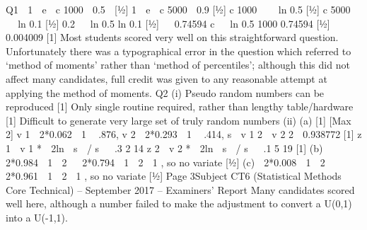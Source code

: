 \documentclass[a4paper,12pt]{article}
\begin{document}
Q1

1  e  c 1000  0.5

[1⁄2]
1  e  c 5000  0.9 [1⁄2]
c 1000    ln 0.5 [1⁄2]
c 5000    ln 0.1 [1⁄2]
0.2  
ln 0.5
ln 0.1
[1⁄2]
  0.74594
c 
 ln 0.5
1000 0.74594
[1⁄2]
 0.004009
[1]
Most students scored very well on this straightforward question.
Unfortunately there was a typographical error in the question which
referred to ‘method of moments’ rather than ‘method of percentiles’;
although this did not affect many candidates, full credit was given to
any reasonable attempt at applying the method of moments.
Q2
(i)
Pseudo random numbers can be reproduced [1]
Only single routine required, rather than lengthy table/hardware [1]
Difficult to generate very large set of truly random numbers
(ii)
(a)
[1]
[Max 2]
v 1  2*0.062  1  .876, v 2  2*0.293  1  .414,
s  v 1 2  v 2 2  0.938772
[1]
z 1  v 1 *  2ln  s  / s   .3 2 14
z 2  v 2 *  2ln  s  / s   .1 5 19 [1]
(b)  2*0.984  1  2   2*0.794  1  2  1 , so no variate [1⁄2]
(c)  2*0.008  1  2   2*0.961  1  2  1 , so no variate [1⁄2]
Page 3Subject CT6 (Statistical Methods Core Technical) – September 2017 – Examiners’ Report
Many candidates scored well here, although a number failed to make
the adjustment to convert a U(0,1) into a U(-1,1).
\end{document}
